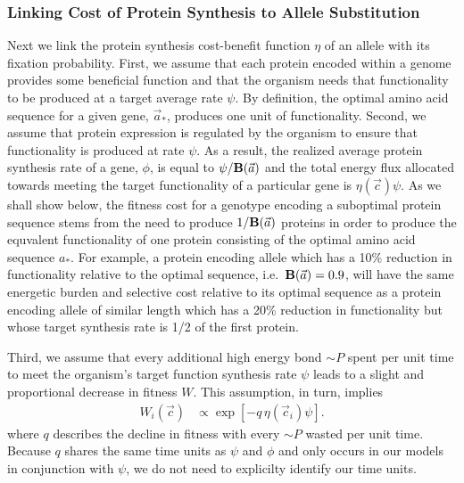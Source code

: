 \documentclass{article}
\newcommand{\Func}{\ensuremath{\text{\textbf{B}}}\xspace}
\newcommand{\simP}{\ensuremath{\sim P}\xspace}
\newcommand{\aopt}{\ensuremath{a_*}\xspace}
\newcommand{\aoptvec}{\ensuremath{\Vec{a}_*}\xspace}
\newcommand{\avec}{\ensuremath{\Vec{a}}\xspace}
\newcommand{\cveci}{\ensuremath{\cvec_i}\xspace}
\newcommand{\cvec}{\ensuremath{\Vec{c}}\xspace}
\begin{document}
\subsubsection*{Linking Cost of Protein Synthesis to Allele Substitution}
Next we link the protein synthesis cost-benefit function $\eta$ of an allele with its fixation probability.
First, we assume that each protein encoded within a genome provides some beneficial function and that the organism needs that functionality to be produced at a target average rate $\psi$.
By definition, the optimal amino acid sequence for a given gene, \aoptvec, produces one unit of functionality.
Second, we assume that protein expression is regulated by the organism to ensure that functionality is produced at rate $\psi$.
As a result, the realized average protein synthesis rate of a gene, $\phi$, is equal to $\psi/\Func(\avec)$ and the total energy flux allocated towards meeting the target functionality of a particular gene is $\eta(\cvec) \psi$.
As we shall show below, the fitness cost for a genotype encoding a suboptimal protein sequence stems from the need to produce $1/\Func(\avec)$ proteins in order to produce the equvalent functionality of one protein consisting of the optimal amino acid sequence \aopt.
For example, a protein encoding allele which has a 10\% reduction in functionality relative to the optimal sequence, i.e.~$\Func(\avec) = 0.9$, will have the same energetic burden and selective cost relative to its optimal sequence as a protein encoding allele of similar length which has a 20\% reduction in functionality but whose target synthesis rate is 1/2 of the first protein.


Third, we assume that every additional high energy bond \simP spent per unit time to meet the organism's target function synthesis rate $\psi$ leads to a slight and proportional decrease in fitness $W$.
This assumption, in turn, implies
\begin{align}
  W_i\left(\cvec\right) &\propto \exp\left[- q \, \eta(\cveci) \psi\right].
\end{align}
where $q$ describes the decline in fitness with every \simP wasted per unit time.
Because $q$ shares the same time units as $\psi$ and $\phi$ and only occurs in our models in conjunction with $\psi$, we do not need to explicilty identify our time units.
\end{document}
